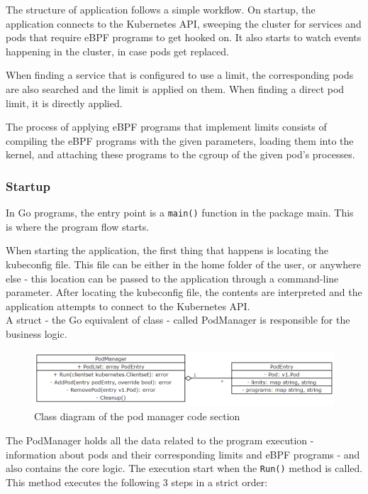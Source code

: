 The structure of application follows a simple workflow. On startup, the application connects to the Kubernetes API, sweeping the cluster for services and pods that require eBPF programs to get hooked on. It also starts to watch events happening in the cluster, in case pods get replaced.

When finding a service that is configured to use a limit, the corresponding pods are also searched and the limit is applied on them. When finding a direct pod limit, it is directly applied.

The process of applying eBPF programs that implement limits consists of compiling the eBPF programs with the given parameters, loading them into the kernel, and attaching these programs to the cgroup of the given pod's processes.

\subsubsection{Startup}
In Go programs, the entry point is a \texttt{main()} function in the package main. This is where the program flow starts.

When starting the application, the first thing that happens is locating the kubeconfig file. This file can be either in the home folder of the user, or anywhere else - this location can be passed to the application through a command-line parameter. After locating the kubeconfig file, the contents are interpreted and the application attempts to connect to the Kubernetes API. \\

A struct - the Go equivalent of class - called PodManager is responsible for the business logic. 
\begin{figure}[H]
	\centering
	\includegraphics[width=\textwidth]{images/uml.png}
	\caption{Class diagram of the pod manager code section}
	\label{fig:uml}
\end{figure}

The PodManager holds all the data related to the program execution - information about pods and their corresponding limits and eBPF programs - and also contains the core logic. The execution start when the \texttt{Run()} method is called. This method executes the following 3 steps in a strict order:

